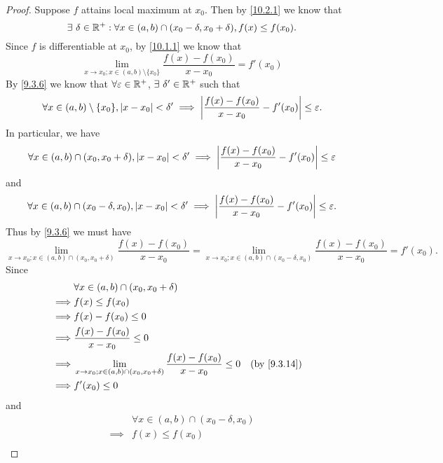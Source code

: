 \begin{proof}
  Suppose \(f\) attains local maximum at \(x_0\).
  Then by \cref{10.2.1} we know that
  \[
    \exists\ \delta \in \mathbb{R}^+ : \forall x \in (a, b) \cap (x_0 - \delta, x_0 + \delta), f(x) \leq f(x_0).
  \]
  Since \(f\) is differentiable at \(x_0\), by \cref{10.1.1} we know that
  \[
    \lim_{x \to x_0 ; x \in (a, b) \setminus \{x_0\}} \dfrac{f(x) - f(x_0)}{x - x_0} = f'(x_0)
  \]
  By \cref{9.3.6} we know that \(\forall \varepsilon \in \mathbb{R}^+\), \(\exists\ \delta' \in \mathbb{R}^+\) such that
  \[
    \forall x \in (a, b) \setminus \{x_0\}, \left\lvert x - x_0\right\rvert < \delta' \implies \left\lvert\dfrac{f(x) - f(x_0)}{x - x_0} - f'(x_0)\right\rvert \leq \varepsilon.
  \]
  In particular, we have
  \[
    \forall x \in (a, b) \cap (x_0, x_0 + \delta), \left\lvert x - x_0\right\rvert < \delta' \implies \left\lvert\dfrac{f(x) - f(x_0)}{x - x_0} - f'(x_0)\right\rvert \leq \varepsilon
  \]
  and
  \[
    \forall x \in (a, b) \cap (x_0 - \delta, x_0), \left\lvert x - x_0\right\rvert < \delta' \implies \left\lvert\dfrac{f(x) - f(x_0)}{x - x_0} - f'(x_0)\right\rvert \leq \varepsilon.
  \]
  Thus by \cref{9.3.6} we must have
  \[
    \lim_{x \to x_0 ; x \in (a, b) \cap (x_0, x_0 + \delta)} \dfrac{f(x) - f(x_0)}{x - x_0} = \lim_{x \to x_0 ; x \in (a, b) \cap (x_0 - \delta, x_0)} \dfrac{f(x) - f(x_0)}{x - x_0} = f'(x_0).
  \]
  Since
  \begin{align*}
             & \forall x \in (a, b) \cap (x_0, x_0 + \delta)                                                                                 \\
    \implies & f(x) \leq f(x_0)                                                                                                              \\
    \implies & f(x) - f(x_0) \leq 0                                                                                                          \\
    \implies & \dfrac{f(x) - f(x_0)}{x - x_0} \leq 0                                                                                         \\
    \implies & \lim_{x \to x_0 ; x \in (a, b) \cap (x_0, x_0 + \delta)} \dfrac{f(x) - f(x_0)}{x - x_0} \leq 0 &  & \text{(by \cref{9.3.14})} \\
    \implies & f'(x_0) \leq 0
  \end{align*}
  and
  \begin{align*}
             & \forall x \in (a, b) \cap (x_0 - \delta, x_0)                                                                                  \\
    \implies & f(x) \leq f(x_0)                                                                                                               \\

\end{align*}
\end{proof}
